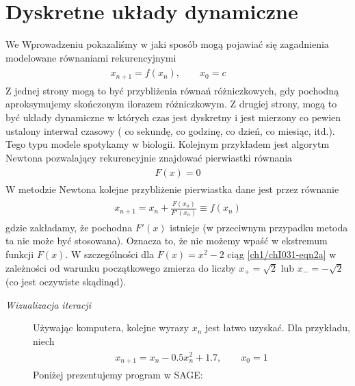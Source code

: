\documentclass[a4paper,12pt,polish]{sphinxmanual}
\begin{document}
\section{Dyskretne układy dynamiczne}
\label{ch1/chI031:dyskretne-uklady-dynamiczne}\label{ch1/chI031::doc}
We Wprowadzeniu pokazaliśmy w jaki sposób mogą pojawiać się zagadnienia modelowane równaniami rekurencyjnymi
\label{ch1/chI031:equation-eqn1}\begin{gather}
\begin{split}x_{n+1} = f(x_n), \quad \quad x_0 = c\qquad\end{split}\label{ch1/chI031-eqn1}
\end{gather}
Z jednej strony mogą to być przybliżenia  równań różniczkowych, gdy pochodną aproksymujemy  skończonym ilorazem różniczkowym. Z drugiej strony, mogą to być układy dynamiczne w których czas jest  dyskretny i jest mierzony co pewien ustalony interwał czasowy ( co sekundę, co godzinę, co dzień, co miesiąc, itd.). Tego typu modele spotykamy w biologii. Kolejnym przykładem jest algorytm Newtona pozwalający rekurencyjnie znajdować pierwiastki równania
\label{ch1/chI031:equation-eqn2}\begin{gather}
\begin{split}F(x) = 0\end{split}\label{ch1/chI031-eqn2}
\end{gather}
W metodzie  Newtona  kolejne przybliżenie pierwiastka dane jest przez równanie
\label{ch1/chI031:equation-eqn2a}\begin{gather}
\begin{split}x_{n+1} = x_n + \frac{F(x_n)}{F'(x_n)}\equiv f(x_n)\end{split}\label{ch1/chI031-eqn2a}
\end{gather}
gdzie zakładamy, że pochodna $F'(x)$ istnieje (w przeciwnym przypadku metoda ta nie może być stosowana). Oznacza to, że nie możemy wpaść w ekstremum funkcji $F(x)$.  W szczególności dla $F(x)=x^2-2$ ciąg \eqref{ch1/chI031-eqn2a} w zależności od warunku początkowego zmierza do liczby $x_{+}=\sqrt{2}$ lub $x_{-}=-\sqrt{2}$  (co jest oczywiste skądinąd).
\begin{description}
\item[{\emph{Wizualizacja iteracji}}] \leavevmode
Używając komputera, kolejne wyrazy $x_n$ jest łatwo uzyskać. Dla przykładu, niech
\label{ch1/chI031:equation-eqn3}\begin{gather}
\begin{split}x_{n+1} = x_n - 0.5  x_{n}^2 +1.7, \qquad x_0 = 1\end{split}\label{ch1/chI031-eqn3}
\end{gather}
Poniżej prezentujemy program w SAGE:

\end{description}
\end{document}

